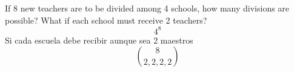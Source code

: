 \item  If 8 new teachers are to be divided among 4 schools, how many divisions are possible? What if each school must receive 2 teachers?
\[4^8\]
Si cada escuela debe recibir aunque sea 2 maestros
\[ \binom{8}{2,2,2,2} \]